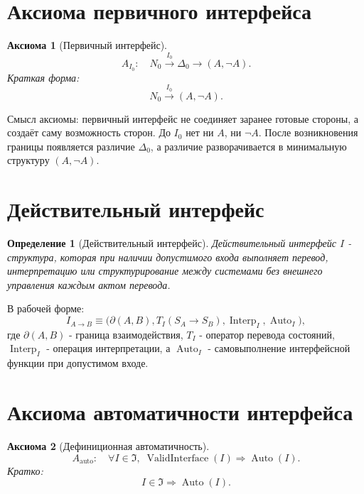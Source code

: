 \documentclass[12pt,a4paper]{article}
\newtheorem{definition}{Определение}
\newtheorem{axiom}{Аксиома}
\DeclareMathOperator{\Valid}{ValidInterface}
\DeclareMathOperator{\Auto}{Auto}
\newcommand{\Ispace}{\mathfrak I}
\begin{document}
\section{Аксиома первичного интерфейса}
\begin{axiom}[Первичный интерфейс]
\begin{equation}
\boxed{A_{I_0}:\quad N_0\xrightarrow{I_0}\Delta_0\to(A,\neg A).}
\end{equation}
Краткая форма:
\begin{equation}
\boxed{N_0\xrightarrow{I_0}(A,\neg A).}
\end{equation}
\end{axiom}

Смысл аксиомы: первичный интерфейс не соединяет заранее готовые стороны, а создаёт саму возможность сторон. До \(I_0\) нет ни \(A\), ни \(\neg A\). После возникновения границы появляется различие \(\Delta_0\), а различие разворачивается в минимальную структуру \((A,\neg A)\).

\section{Действительный интерфейс}
\begin{definition}[Действительный интерфейс]
Действительный интерфейс \(I\) - структура, которая при наличии допустимого входа выполняет перевод, интерпретацию или структурирование между системами без внешнего управления каждым актом перевода.
\end{definition}

В рабочей форме:
\begin{equation}
I_{A\to B}\equiv\bigl(\partial(A,B),T_I(S_A\to S_B),\operatorname{Interp}_I,\Auto_I\bigr),
\end{equation}
где \(\partial(A,B)\) - граница взаимодействия, \(T_I\) - оператор перевода состояний, \(\operatorname{Interp}_I\) - операция интерпретации, а \(\Auto_I\) - самовыполнение интерфейсной функции при допустимом входе.

\section{Аксиома автоматичности интерфейса}
\begin{axiom}[Дефиниционная автоматичность]
\begin{equation}
\boxed{A_{\mathrm{auto}}:\quad \forall I\in\Ispace,\;\Valid(I)\Rightarrow\Auto(I).}
\end{equation}
Кратко:
\begin{equation}
\boxed{I\in\Ispace\Rightarrow\Auto(I).}
\end{equation}
\end{axiom}
\end{document}
